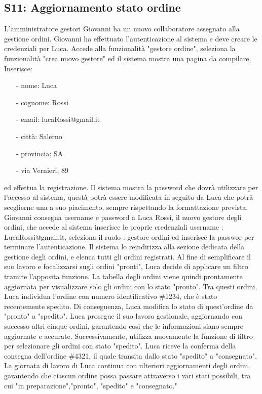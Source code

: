 \documentclass[12pt, a4paper, oneside]{book}
\begin{document}
    \subsection*{S11: Aggiornamento stato ordine}
        L'amministratore gestori Giovanni ha un nuovo collaboratore assegnato alla gestione ordini. Giovanni ha effettuato
        l'autenticazione al sistema e deve creare le credenziali per Luca. Accede alla funzionalità "gestore ordine",
        seleziona la funzionalità "crea nuovo gestore" ed il sistema mostra una pagina da compilare. Inserisce:
        \begin{itemize}
            \item [-] nome: Luca
            \item [-] cognome: Rossi
            \item [-] email: lucaRossi@gmail.it
            \item [-] città: Salerno
            \item [-] provincia: SA
            \item [-] via Vernieri, 89
        \end{itemize}
        ed effettua la registrazione. Il sistema mostra la password che dovrà utilizzare per l'accesso al sistema, questà
        potrà essere modificata in seguito da Luca che potrà sceglierne una a suo piacimento, sempre rispettando la formattazione
        prevista. Giovanni consegna username e password a Luca Rossi, il nuovo gestore degli ordini, che accede al sistema
        inserisce le proprie credenziali username : LucaRossi@gmail.it, seleziona il ruolo : gestore ordini ed inserisce la
        passwor per terminare l'autenticazione. Il sistema lo reindirizza alla sezione dedicata della gestione degli ordini,
        e elenca tutti gli ordini registrati. Al fine di semplificare il suo lavoro e focalizzarsi sugli ordini "pronti", Luca
        decide di applicare un filtro tramite l'apposita funzione. La tabella degli ordini viene quindi prontamente aggiornata
        per visualizzare solo gli ordini con lo stato "pronto". Tra questi ordini, Luca individua l'ordine con numero
        identificativo \#1234, che è stato recentemente spedito. Di conseguenza, Luca modifica lo stato di quest'ordine
        da "pronto" a "spedito". Luca prosegue il suo lavoro gestionale, aggiornando con successo altri cinque ordini,
        garantendo così che le informazioni siano sempre aggiornate e accurate. Successivamente, utilizza nuovamente la
        funzione di filtro per selezionare gli ordini con stato "spedito". Luca riceve la conferma della consegna
        dell'ordine \#4321, il quale transita dallo stato "spedito" a "consegnato". La giornata di lavoro di Luca continua
        con ulteriori aggiornamenti degli ordini, garantendo che ciascun ordine possa passare attraverso i vari stati
        possibili, tra cui "in preparazione","pronto", "spedito" e "consegnato."
\end{document}
